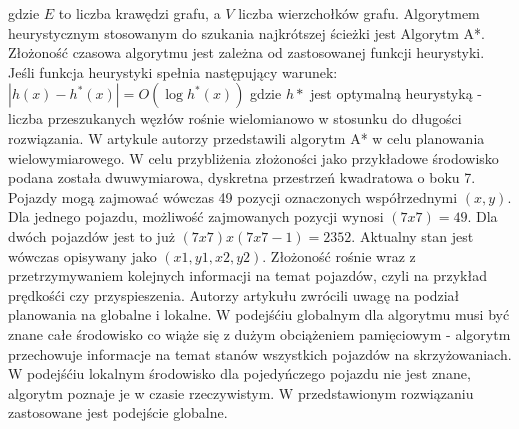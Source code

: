 \newline
gdzie \begin{math}E\end{math} to liczba krawędzi grafu, a \begin{math}V\end{math} liczba wierzchołków grafu.
\indent
\newline
\newline
\indent
  Algorytmem heurystycznym stosowanym do szukania najkrótszej ścieżki jest Algorytm A*. Złożoność czasowa algorytmu jest zależna od zastosowanej funkcji heurystyki. Jeśli funkcja heurystyki spełnia następujący warunek:
\newline
\newline
\begin{math}
|h(x)-h^{*}(x)|=O(\log h^{*}(x))
\end{math}
\newline
\newline
gdzie \begin{math}h*\end{math} jest optymalną heurystyką - liczba przeszukanych węzłów rośnie wielomianowo w stosunku do długości rozwiązania.
\newline
\newline
\indent
W artykule \cite{wojnicki2015robust} autorzy przedstawili algorytm A* w celu planowania wielowymiarowego. W celu przybliżenia złożoności jako przykładowe środowisko podana została dwuwymiarowa, dyskretna przestrzeń kwadratowa o boku 7. Pojazdy mogą zajmować wówczas 49 pozycji oznaczonych współrzednymi \begin{math}(x, y)\end{math}. Dla jednego pojazdu, możliwość zajmowanych pozycji wynosi \begin{math}(7 x 7) = 49 \end{math}. Dla dwóch pojazdów jest to już \begin{math}(7 x 7) x (7 x 7 - 1) = 2352 \end{math}. Aktualny stan jest wówczas opisywany jako \begin{math}(x1, y1, x2, y2)\end{math}. Złożoność rośnie wraz z przetrzymywaniem kolejnych informacji na temat pojazdów, czyli  na przykład prędkośći czy przyspieszenia.
\newline
\indent
Autorzy artykułu \cite{leena2014survey} zwrócili uwagę na podział planowania na globalne i lokalne. W podejśćiu globalnym dla algorytmu musi być znane całe środowisko co wiąże się z dużym obciążeniem pamięciowym - algorytm przechowuje informacje na temat stanów wszystkich pojazdów na skrzyżowaniach. W podejśćiu lokalnym środowisko dla pojedyńczego pojazdu nie jest znane, algorytm poznaje je w czasie rzeczywistym. W przedstawionym rozwiązaniu zastosowane jest podejście globalne.

